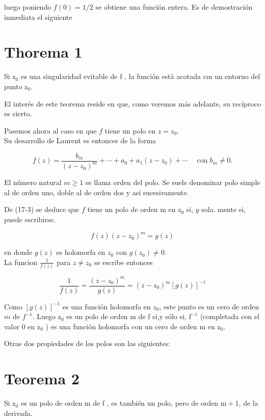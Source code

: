 \documentclass[10pt]{article}
\theoremstyle{plain}
\theoremstyle{definition}
\theoremstyle{remark}
\begin{document}
luego poniendo $f(0)=1 / 2$ se obtiene una función entera. Es de demostración inmediata el siguiente

\section*{Thorema 1}
Si $\mathrm{z}_0$ es una singularidad evitable de f , la función està acotada cın un entorno del punto $\mathrm{z}_{0}$.

El interés de este teorema reside en que, como veremos más adelante, su recíproco es cierto.

Pasemos ahora al caso en que $f$ tiene un polo en $z=z_{0}$.\\
Su desarrollo de Laurent es entonces de la forma

$$
f(z)=\frac{b_{m}}{\left(z-z_{0}\right)^{m}}+\cdots+a_{0}+a_{1}\left(z-z_{0}\right)+\cdots \quad \operatorname{con} b_{m} \neq 0 .
$$

El número natural $m \geqslant 1$ se llama orden del polo. Se suele denominar polo simple al de orden uno, doble al de orden dos y así sucesivamente.

De (17-3) se deduce que $f$ tiene un polo de orden m en $\mathrm{z}_{0}$ si, $y$ sola. mente si, puede escribirse.


\begin{equation*}
f(z)\left(z-z_{0}\right)^{m}=g(z) \tag{17-4}
\end{equation*}


en donde $g(z)$ es holomorfa en $z_{0}$ con $g\left(z_{0}\right) \neq 0$.\\
La funcion $\frac{1}{f(z)}$ para $z \neq z_{0}$ se escribe entonces

$$
\frac{1}{f(z)}=\frac{\left(z-z_{0}\right)^{m}}{g(z)}=\left(z-z_{0}\right)^{m}[g(z)]^{-1}
$$

Como $[g(z)]^{-1}$ es una función holomorfa en $z_{0}$, este punto es un cero de orden $m$ de $f^{-1}$. Luego $\mathrm{z}_{0}$ es un polo de orden m de f si,y sólo si, $\mathrm{f}^{-1}$ (completada con el valor 0 en $\mathrm{z}_{0}$ ) es una función holomorfa con un cero de orden m en $\mathrm{z}_{0}$.

Otras dos propiedades de los polos son las siguientes:

\section*{Teorema 2}
Si $\mathrm{z}_{0}$ es un polo de orden m de f , es también un polo, pero de orden $\mathrm{m}+1$, de la derivada.
\end{document}
